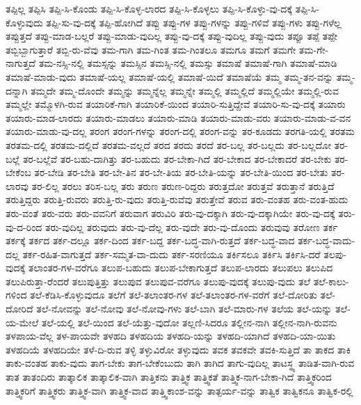 {ತಪ್ಪಿಲ್ಲ
ತಪ್ಪಿಸಿ
ತಪ್ಪಿ-ಸಿ-ಕೊಂಡು
ತಪ್ಪಿ-ಸಿ-ಕೊಳ್ಳ-ಲಾರದ
ತಪ್ಪಿ-ಸಿ-ಕೊಳ್ಳಲು
ತಪ್ಪಿ-ಸಿ-ಕೊಳ್ಳು-ವು-ದಕ್ಕೆ
ತಪ್ಪಿ-ಸಿ-ಕೊಳ್ಳುವುದು
ತಪ್ಪಿ-ಸು-ವು-ದಕ್ಕೆ
ತಪ್ಪಿ-ಹೋಗಿದೆ
ತಪ್ಪು
ತಪ್ಪು-ಗಳ
ತಪ್ಪು-ಗಳನ್ನು
ತಪ್ಪು-ಗಳಿವೆ
ತಪ್ಪು-ಗಳು
ತಪ್ಪು-ಗಳೆಲ್ಲ
ತಪ್ಪುತ್ತದೆ
ತಪ್ಪು-ಮಾಡ-ಬಲ್ಲರೆ
ತಪ್ಪು-ಮಾಡು-ವುದಿಲ್ಲ
ತಪ್ಪು-ವು-ದಕ್ಕೆ
ತಪ್ಪು-ವುದಿಲ್ಲ
ತಪ್ಪು-ವುದು
ತಪ್ಪೂ
ತಪ್ಪೆ
ತಪ್ಪೇ
ತಬ್ಬಿಬ್ಬಾಗುತ್ತಾರೆ
ತಬ್ಬಿ-ರು-ವೆವು
ತಮ-ಗಾಗಿ
ತಮ-ಗಿಂತ
ತಮ-ಗಿಂತಲೂ
ತಮಗೂ
ತಮಗೆ
ತಮಗೇ
ತಮ-ಗೇ-ನಾಗುತ್ತದೆ
ತಮ-ನಸ್ಸಿ-ನಲ್ಲಿ
ತಮಸ್ಸನ್ನು
ತಮಸ್ಸಿನ
ತಮಸ್ಸಿ-ನಲ್ಲಿ
ತಮಸ್ಸು
ತಮಾಷೆ
ತಮಾಷೆ-ಗಾಗಿ
ತಮಾಷೆ-ಮಾಡಿ
ತಮಾಷೆ-ಮಾಡು-ವುದು
ತಮಾಷೆ-ಯಲ್ಲ
ತಮಾಷೆ-ಯಲ್ಲಿ
ತಮಾಷೆ-ಯಿದೆ
ತಮಾಷೆಯೆ
ತಮ್ಮ
ತಮ್ಮ-ತನ-ವನ್ನು
ತಮ್ಮ-ದನ್ನಾಗಿ
ತಮ್ಮದೇ
ತಮ್ಮ-ದೊಂದೇ
ತಮ್ಮನ್ನು
ತಮ್ಮನ್ನೆಲ್ಲ
ತಮ್ಮನ್ನೇ
ತಮ್ಮಲ್ಲಿ
ತಮ್ಮಲ್ಲಿದೆ
ತಮ್ಮಲ್ಲಿಯೇ
ತಮ್ಮಲ್ಲಿ-ರುವ
ತಮ್ಮಲ್ಲೇ
ತಮ್ಮೊಳಗಿ-ರುವ
ತಯಾರಿಕೆ-ಗಾಗಿ
ತಯಾರಿಕೆ-ಯಿಂದ
ತಯಾರಿ-ಸುತ್ತಿದ್ದೇವೆ
ತಯಾರಿ-ಸು-ವು-ದಕ್ಕೆ
ತಯಾರು
ತಯಾರು-ಮಾಡ-ಲಾರದು
ತಯಾರು-ಮಾಡಲು
ತಯಾರು-ಮಾಡಿ
ತಯಾರು-ಮಾಡು-ವರು
ತಯಾರು-ಮಾಡು-ವ-ವನ
ತಯಾರು-ಮಾಡು-ವು-ದಲ್ಲ
ತರಂಗ
ತರಂಗ-ಗಳನ್ನು
ತರಂಗ-ದಲ್ಲಿ
ತರಂಗ-ವನ್ನು
ತರ-ಕೂಡದು
ತರಗತಿ-ಯಲ್ಲಿ
ತರತಮ
ತರತಮ-ದಲ್ಲಿ
ತರತಮ-ದಲ್ಲಿದೆ
ತರತಮ-ವಲ್ಲದೆ
ತರದ
ತರದು
ತರದೆ
ತರ-ಬಲ್ಲ
ತರ-ಬಲ್ಲದು
ತರ-ಬಲ್ಲದೋ
ತರ-ಬಲ್ಲೆ
ತರ-ಬಲ್ಲೆವೆ
ತರ-ಬಹು-ದಾಗಿತ್ತು
ತರ-ಬಹುದು
ತರ-ಬೇಕಾ-ಗಿದೆ
ತರ-ಬೇಕಾದ
ತರ-ಬೇಕಾದರೆ
ತರ-ಬೇಕು
ತರ-ಬೇಕೆಂಬ
ತರ-ಬೇಡಿ
ತರ-ಬೇತಿ
ತರ-ಬೇ-ತಿನ
ತರ-ಬೇ-ತಿಯ
ತರ-ಬೇತಿ-ಯನ್ನು
ತರ-ಬೇತಿ-ಯಿಂದ
ತರ-ಬೇತು
ತರ-ಲಾರವು
ತರ-ಲಿಲ್ಲ
ತರಲು
ತರಿಸ-ಬಲ್ಲ
ತರು
ತರುಣ
ತರುಣ-ರಿದ್ದರು
ತರುತ್ತದೋ
ತರುತ್ತವೆ
ತರುತ್ತಾನೆ
ತರುತ್ತಿದೆ
ತರುತ್ತಿದ್ದರು
ತರುತ್ತಿ-ರುವರು
ತರುತ್ತಿ-ರು-ವುದು
ತರುತ್ತಿ-ರುವೆವು
ತರುತ್ತೇವೆ
ತರುವ
ತರು-ವಂತಹ
ತರು-ವಂತ-ಹುದು
ತರು-ವಂತೆ
ತರು-ವರು
ತರು-ವವನಿಗೆ
ತರುವಾಗ
ತರುವಿರಿ
ತರು-ವು-ದಕ್ಕಾಗಿ
ತರು-ವು-ದಕ್ಕಾಗಿಯೇ
ತರು-ವು-ದಕ್ಕೆ
ತರು-ವು-ದ-ರಿಂದ
ತರು-ವುದಿಲ್ಲ
ತರುವುದು
ತರು-ವು-ದೆಲ್ಲ
ತರು-ವುದೇ
ತರು-ವು-ದೊಂದು
ತರುವುವು
ತರೋಣ
ತರ್ಕ
ತರ್ಕಕ್ಕೆ
ತರ್ಕದ
ತರ್ಕ-ದಲ್ಲೂ
ತರ್ಕ-ದಿಂದ
ತರ್ಕ-ಬದ್ದ
ತರ್ಕ-ಬದ್ಧ-ವಾಗಿ-ರುತ್ತದೆ
ತರ್ಕ-ಬದ್ಧ-ವಾದ
ತರ್ಕ-ಬದ್ಧ-ವಾದು-ದಲ್ಲ
ತರ್ಕ-ರಹಿತ-ವಾಗುತ್ತದೆ
ತರ್ಕ-ಸಮ್ಮತ-ವಾ-ದುದು
ತರ್ಕ-ಸರಣಿಯೂ
ತರ್ಕಿಸಲೂ
ತರ್ಕಿಸಿ
ತರ್ಕಿಸಿ-ದರೆ
ತಲಪು-ವುದಕ್ಕೆ
ತಲಾಂತರ-ಗಳ-ವರೆಗೂ
ತಲುಪ-ಬಹುದು
ತಲುಪ-ಬೇಕಾಗುತ್ತದೆ
ತಲುಪ-ಲಾರದು
ತಲುಪಲು
ತಲುಪಿದ
ತಲುಪಿರುತ್ತಾ-ರೆಂದರೆ
ತಲುಪುತ್ತಿತ್ತು
ತಲುಪುವ
ತಲುಪುವ-ವರೆಗೂ
ತಲುಪು-ವುದಕ್ಕೆ
ತಲುಪು-ವುದು
ತಲೆ
ತಲೆ-ಕಾಲು-ಗಳಿಂದ
ತಲೆ-ಕೆಡಿಸಿ-ಕೊಳ್ಳುವುದೂ
ತಲೆಗೆ
ತಲೆ-ತಲಾಂತರ-ಗಳ
ತಲೆ-ತಲಾಂತರ-ಗಳ-ವರೆಗೆ
ತಲೆ-ದೋರಿತು
ತಲೆ-ದೋರಿದೆ
ತಲೆ-ನೋವನ್ನು
ತಲೆ-ನೋವು
ತಲೆ-ನೋವು-ಗಳು
ತಲೆ-ಬಾಗಿ
ತಲೆ-ಮಾರು-ಗಳ
ತಲೆಯ
ತಲೆ-ಯನ್ನು
ತಲೆ-ಯ-ಮೇಲೆ
ತಲೆ-ಯಲ್ಲಿ
ತಲೆ-ಯಿಂದ
ತಲೆ-ಯೆತ್ತು-ವುದೋ
ತಲ್ಲಣಿ-ಸಿದರೂ
ತಲ್ಲೀನ-ನಾಗಿ
ತಲ್ಲೀನ-ನಾಗಿ-ರುವನು
ತಳಪಾಯ-ವೆಲ್ಲ
ತಳ-ಪಾಯವೇ
ತಳಹದಿ
ತಳಹದಿಯ
ತಳಹದಿ-ಯನ್ನು
ತಳಹದಿ-ಯಾಗಿದೆ
ತಳಹದಿ-ಯಾ-ಯಿತು
ತಳಹದಿಯೆ
ತಳಹದಿಯೇ
ತಳೆ-ದಿ-ರುವ
ತಳ್ಳಿ
ತಳ್ಳುವಿರೋ
ತಳ್ಳುವುದು
ತವಕ
ತವಕವೇ
ತವಕಿ-ಸುತ್ತಿದೆ
ತಾ
ತಾಕದ
ತಾಕಿ
ತಾಕು-ವಂತಹ
ತಾಕು-ವುದು
ತಾಗ-ಬೇಕು
ತಾಗ-ಬೇಕೆಂಬುದು
ತಾಗಿ
ತಾಗಿದ
ತಾಗು-ವುದಿಲ್ಲ
ತಾಟಸ್ಥ್ಯ
ತಾಡಿತ-ವಾಗಿ-ರುವ
ತಾತ
ತಾತಂದಿರು
ತಾತ್ಕಾಲಿಕ
ತಾತ್ಕಾಲಿಕ-ವಾಗಿ
ತಾತ್ತಿಕನು
ತಾತ್ತ್ವಿಕ
ತಾತ್ತ್ವಿಕತೆ
ತಾತ್ತ್ವಿಕ-ನಾಗ-ಬೇಕಾ-ಗಿದೆ
ತಾತ್ತ್ವಿಕರಿಂದ
ತಾತ್ತ್ವಿಕರಿಗೆ
ತಾತ್ತ್ವಿಕರು
ತಾತ್ತ್ವಿಕ-ವಾಗಿ
ತಾತ್ತ್ವಿಕ-ವಾದ
ತಾತ್ತ್ವಿಕಾಂಶ-ವನ್ನು
ತಾತ್ಪರ್ಯ-ವನ್ನು
ತಾತ್ವಿಕ
ತಾತ್ವಿಕನೂ
ತಾತ್ವಿಕ-ರಲ್ಲಿ
}
